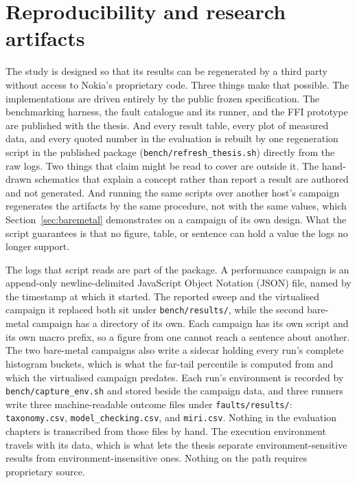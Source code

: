 \section{Reproducibility and research artifacts}\label{sec:repro}
The study is designed so that its results can be regenerated by a third party without access to
Nokia's proprietary code. Three things make that possible. The implementations are driven
entirely by the public frozen specification. The benchmarking harness, the fault catalogue and
its runner, and the FFI prototype are published with the thesis. And every result table, every
plot of measured data, and every quoted number in the evaluation is rebuilt by one regeneration
script in the published package (\texttt{bench/refresh\_thesis.sh}) directly from the raw logs.
Two things that claim might be read to cover are outside it. The hand-drawn schematics that
explain a concept rather than report a result are authored and not generated. And running the
same scripts over another host's campaign regenerates the artifacts by the same procedure, not
with the same values, which Section~\ref{sec:baremetal} demonstrates on a campaign of its own
design. What the script guarantees is that no figure, table, or sentence can hold a value the
logs no longer support.

The logs that script reads are part of the package. A performance campaign is an append-only
newline-delimited JavaScript Object Notation (JSON) file, named by the timestamp at which it
started. The reported sweep and the virtualised campaign it replaced both sit under
\texttt{bench/results/}, while the second bare-metal campaign has a directory of its own. Each
campaign has its own script and its own macro prefix, so a figure from one cannot reach a
sentence about another. The two bare-metal campaigns also write a sidecar holding every run's
complete histogram buckets, which is what the far-tail percentile is computed from and which the
virtualised campaign predates. Each run's environment is recorded by
\texttt{bench/capture\_env.sh} and stored beside the campaign data, and three runners write three
machine-readable outcome files under \texttt{faults/results/}: \texttt{taxonomy.csv},
\texttt{model\_checking.csv}, and \texttt{miri.csv}. Nothing in the evaluation chapters is
transcribed from those files by hand. The execution environment travels with its data, which
is what lets the thesis separate environment-sensitive results from
environment-insensitive ones. Nothing on the path requires proprietary source.

